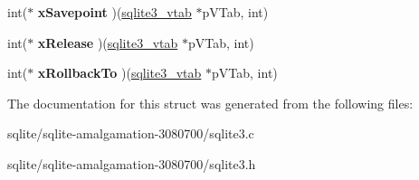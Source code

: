 \begin{DoxyCompactItemize}
\item 
\hypertarget{structsqlite3__module_af90f1df803fce1b90048864aeeeee890}{int($\ast$ {\bfseries x\+Savepoint} )(\hyperlink{structsqlite3__vtab}{sqlite3\+\_\+vtab} $\ast$p\+V\+Tab, int)}\label{structsqlite3__module_af90f1df803fce1b90048864aeeeee890}

\item 
\hypertarget{structsqlite3__module_a8dcaa6dc6d9563c8da57e4c8c5055609}{int($\ast$ {\bfseries x\+Release} )(\hyperlink{structsqlite3__vtab}{sqlite3\+\_\+vtab} $\ast$p\+V\+Tab, int)}\label{structsqlite3__module_a8dcaa6dc6d9563c8da57e4c8c5055609}

\item 
\hypertarget{structsqlite3__module_a767753c6c97d1f622e5113367a0547b5}{int($\ast$ {\bfseries x\+Rollback\+To} )(\hyperlink{structsqlite3__vtab}{sqlite3\+\_\+vtab} $\ast$p\+V\+Tab, int)}\label{structsqlite3__module_a767753c6c97d1f622e5113367a0547b5}

\end{DoxyCompactItemize}


The documentation for this struct was generated from the following files\+:\begin{DoxyCompactItemize}
\item 
sqlite/sqlite-\/amalgamation-\/3080700/sqlite3.\+c\item 
sqlite/sqlite-\/amalgamation-\/3080700/sqlite3.\+h\end{DoxyCompactItemize}
